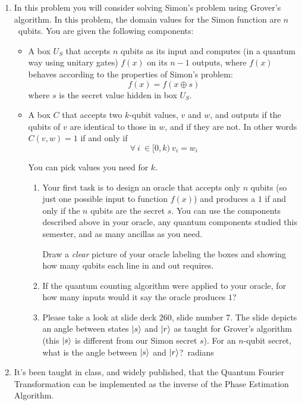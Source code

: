 \documentclass[12pt]{article}
\begin{document}
\begin{enumerate}
\begin{enumerate}[label=\theenumi.\arabic*]
    \end{enumerate}

\item{}  In this problem you will consider solving Simon's problem using Grover's algorithm.  In this problem, the domain values for the Simon function are $n$~qubits.  You are given the following components:
\begin{itemize}
    \item A box $U_S$ that accepts $n$ qubits as its input and computes (in a quantum way using unitary gates) $f(x)$ on its $n-1$ outputs, where $f(x)$ behaves according to the properties of Simon's problem:
    \[
    f(x) = f(x\oplus s)
    \]
    where $s$ is the secret value hidden in box $U_S$.
    \item A box $C$ that accepts two $k$-qubit values, $v$ and $w$, and outputs \QOne{} if the qubits of $v$ are identical to those in $w$, and \QZero{} if they are not.  In other words $C(v,w)=1$ if and only if
    \[
    \forall\ i\ \in [0,k)\ v_{i} = w_{i}
    \]
    
    You can pick values you need for $k$.
    \begin{enumerate}[label=\theenumi.\arabic*]
        \item Your first task is to design an oracle that accepts only $n$ qubits (so just one possible input to function $f(x)$) and produces a $1$ if and only if the $n$ qubits are the secret $s$.  You can use the components described above in your oracle, any quantum components studied this semester, and as many ancillas as you need.

        Draw a \emph{clear} picture of your oracle labeling the boxes and showing how many qubits each line in and out requires.
        \LeaveSpace[4in]{}
        \item If the quantum counting algorithm were applied to your oracle, for how many inputs would it say the oracle produces $1$?\Blank{}
        \item Please take a look at slide deck 260, slide number 7.  The slide depicts an angle between states $\ket{s}$ and $\ket{r}$ as taught for Grover's algorithm (this $\ket{s}$ is different from our Simon secret $s$).  For an $n$-qubit secret, what is the angle between $\ket{s}$ and $\ket{r}$?\Blank{}~radians
        
        
    \end{enumerate}
\end{itemize}

\item{}  It's been taught in class, and widely published, that the Quantum Fourier Transformation can be implemented as the inverse of the Phase Estimation Algorithm.


\end{enumerate}
\end{document}
